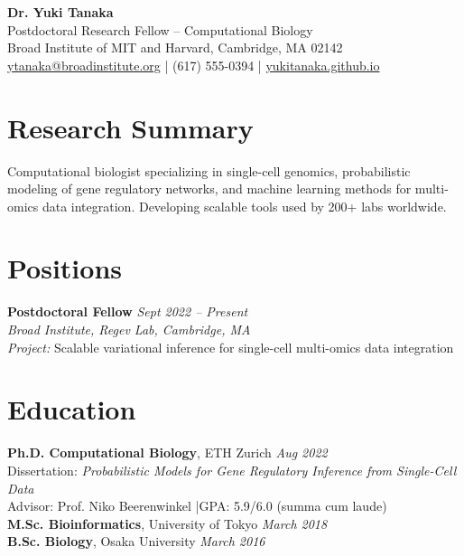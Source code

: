 \documentclass[11pt,a4paper]{article}
\begin{document}
\begin{center}
  {\LARGE \textbf{Dr. Yuki Tanaka}}\\[4pt]
  Postdoctoral Research Fellow -- Computational Biology\\[3pt]
  Broad Institute of MIT and Harvard, Cambridge, MA 02142\\
  \href{mailto:ytanaka@broadinstitute.org}{ytanaka@broadinstitute.org} \quad|\quad
  (617) 555-0394 \quad|\quad
  \href{https://yukitanaka.github.io}{yukitanaka.github.io}
\end{center}

\section{Research Summary}
Computational biologist specializing in single-cell genomics, probabilistic modeling of gene regulatory networks, and machine learning methods for multi-omics data integration. Developing scalable tools used by 200+ labs worldwide.

\section{Positions}
\noindent\textbf{Postdoctoral Fellow} \hfill \textit{Sept 2022 -- Present}\\
\textit{Broad Institute, Regev Lab, Cambridge, MA}\\
\textit{Project:} Scalable variational inference for single-cell multi-omics data integration

\section{Education}
\textbf{Ph.D. Computational Biology}, ETH Zurich \hfill \textit{Aug 2022}\\
Dissertation: \textit{Probabilistic Models for Gene Regulatory Inference from Single-Cell Data}\\
Advisor: Prof. Niko Beerenwinkel \quad|\quad GPA: 5.9/6.0 (summa cum laude)\\[3pt]
\textbf{M.Sc. Bioinformatics}, University of Tokyo \hfill \textit{March 2018}\\
\textbf{B.Sc. Biology}, Osaka University \hfill \textit{March 2016}
\end{document}
